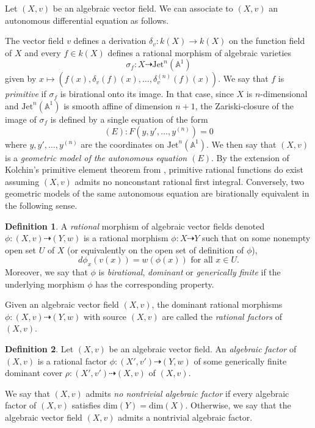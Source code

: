 \documentclass[12pt]{amsart}
\theoremstyle{definition}
\newtheorem{definition}{Definition}[subsection]
\theoremstyle{plain}
\theoremstyle{exampstyle}
\theoremstyle{exampstyle}\newtheorem{thmxbis}{Theorem}
\numberwithin{equation}{section}
\theoremstyle{remark}
\begin{document}
{ \label{remark-vectorfields-autonomous} Let $(X,v)$ be an algebraic vector field. We can associate to $(X,v)$ an autonomous differential equation as follows. 

The vector field $v$ defines a derivation $\delta_v : k(X) \rightarrow k(X)$ on the function field of $X$ and every $f \in k(X)$ defines a rational morphism of algebraic varieties
$$ \sigma_f: X \dashrightarrow \mathrm{Jet}^n(\mathbb{A}^1)$$
given by $x \mapsto ( f(x), \delta_v(f)(x), \ldots, {\delta^{(n)}_v(f)}(x) )$.
We say that $f$ is {\em primitive} if $\sigma_f$ is birational onto its image. In that case, since $X$ is $n$-dimensional and $\mathrm{Jet}^n(\mathbb{A}^1)$ is smooth affine of dimension $n + 1$, the Zariski-closure of the image of $\sigma_f$ is defined by a single equation of the form 
$$ (E): F(y,y',\ldots, y^{(n)}) = 0 $$
where $y,y',\ldots, y^{(n)}$ are the coordinates on $\mathrm{Jet}^n(\mathbb{A}^1)$. We then say that $(X,v)$ is a {\em geometric model of the autonomous equation $(E)$}. By the extension of Kolchin's primitive element theorem from \cite{Pogudin}, primitive rational functions do exist assuming $(X,v)$ admits no nonconstant rational first integral. Conversely, two geometric models of the same autonomous equation are birationally equivalent in the following sense.}

\begin{definition} 
A {\em rational} morphism of algebraic vector fields denoted $\phi : (X,v) \dashrightarrow (Y,w)$ 
is a rational morphism $\phi: X \dashrightarrow Y$ such that on some nonempty open set $U$ of $X$ (or equivalently on the open set of definition of $\phi$), 
$$d\phi_x(v(x)) = w(\phi(x)) \text{ for all } x \in U.$$  Moreover, we say that $\phi$ is {\em birational}, {\em dominant} or {\em{generically finite}} if the underlying morphism $\phi$ has the corresponding property.  
\end{definition} 

Given an algebraic vector field $(X,v)$,  the dominant rational morphisms $\phi : (X,v) \dashrightarrow (Y,w)$ with source $(X,v)$ are called the {\em rational factors} of $(X,v)$. 

\begin{definition}\label{definition-noalgebraicfactors}
Let $(X,v)$ be an algebraic vector field. An {\em algebraic factor} of  $(X,v)$ is a rational factor $\phi: (X',v') \dashrightarrow (Y,w)$
of some generically finite dominant cover $\rho : (X',v') \dashrightarrow (X,v)$ of $(X,v)$. 

\noindent We say that $(X,v)$ admits {\em no nontrivial algebraic factor} if every algebraic factor of $(X,v)$ satisfies $\mathrm{dim}(Y) = \mathrm{dim}(X)$. Otherwise, we say that the algebraic vector field $(X,v)$ admits a nontrivial algebraic factor.
\end{definition} 
\end{document}

